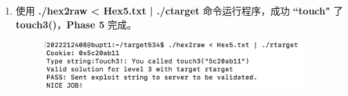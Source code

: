 \begin{enumerate}
            \item 使用 \textbf{./hex2raw < Hex5.txt | ./ctarget} 命令运行程序，成功 \textbf{``touch"} 了 \textbf{touch3()}，\textbf{Phase 5} 完成。
                \begin{figure}[htbp]
                    \hspace*{1.5cm}
                    \includegraphics*[width = 10cm]{s5_2.png}
                \end{figure}
        \end{enumerate}
        

    